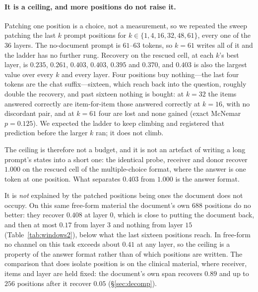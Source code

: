 \paragraph{It is a ceiling, and more positions do not raise it.} Patching one
position is a choice, not a measurement, so we repeated the sweep patching the
last $k$ prompt positions for $k \in \{1,4,16,32,48,61\}$, every one of the
$36$ layers. The no-document prompt is $61$--$63$ tokens, so $k=61$ writes all
of it and the ladder has no further rung. Recovery on the rescued cell, at each
$k$'s best layer, is $0.235$, $0.261$, $0.403$, $0.403$, $0.395$ and $0.370$,
and $0.403$ is also the largest value over every $k$ and every layer. Four
positions buy nothing---the last four tokens are the chat suffix---sixteen,
which reach back into the question, roughly double the recovery, and past
sixteen nothing is bought: at $k=32$ the items answered correctly are
item-for-item those answered correctly at $k=16$, with no discordant pair, and
at $k=61$ four are lost and none gained (exact McNemar $p=0.125$). We expected
the ladder to keep climbing and registered that prediction before the larger
$k$ ran; it does not climb.

The ceiling is therefore not a budget, and it is not an artefact of writing a
long prompt's states into a short one: the identical probe, receiver and donor
recover $1.000$ on the rescued cell of the multiple-choice format, where the
answer is one token at one position. What separates $0.403$ from $1.000$ is the
answer format.

It is \emph{not} explained by the patched positions being ones the document
does not occupy. On this same free-form material the document's own $688$
positions do no better: they recover $0.408$ at layer $0$, which is close to
putting the document back, and then at most $0.17$ from layer $3$ and nothing
from layer $15$ (Table~\ref{tab:windows2}), below what the last sixteen
positions reach. In free-form no channel on this task exceeds about $0.41$ at
any layer, so the ceiling is a property of the answer format rather than of
which positions are written. The comparison that does isolate position is on
the clinical material, where receiver, items and layer are held fixed: the
document's own span recovers $0.89$ and up to $256$ positions after it recover
$0.05$ (\S\ref{sec:decomp}).

